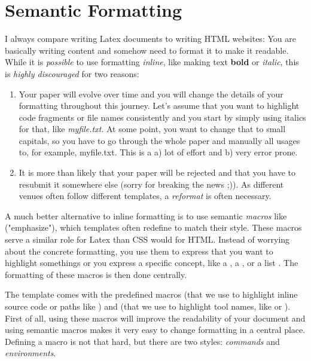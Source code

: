 \section{Semantic Formatting}

I always compare writing Latex documents to writing HTML websites: You are basically writing content and somehow need to format it to make it readable.
While it is \emph{possible} to use formatting \emph{inline}, like making text {\bf bold} or {\it italic}, this is \emph{highly discouraged} for two reasons:

\begin{enumerate}
%
\item Your paper will evolve over time and you will change the details of your formatting throughout this journey.
Let's assume that you want to highlight code fragments or file names consistently and you start by simply using italics for that, like {\it myfile.txt}.
At some point, you want to change that to small capitals, so you have to go through the whole paper and manually all usages to, for example, {\sc myfile.txt}.
This is a a) lot of effort and b) very error prone.
%
\item It is more than likely that your paper will be rejected and that you have to resubmit it somewhere else (sorry for breaking the news ;)).
As different venues often follow different templates, a \emph{reformat} is often necessary.
%
\end{enumerate}

A much better alternative to inline formatting is to use semantic \emph{macros} like  ("emphasize"), which templates often redefine to match their style.
These macros serve a similar role for Latex than CSS would for HTML.
Instead of worrying about the concrete formatting, you use them to express that you want to highlight somethings or you express a specific concept, like a , a , or a list .
The formatting of these macros is then done centrally.

The template comes with the predefined macros  (that we use to highlight inline source code or paths like ) and  (that we use to highlight tool names, like  or ).
First of all, using these macros will improve the readability of your document and using semantic macros makes it very easy to change formatting in a central place.
Defining a macro is not that hard, but there are two styles: \emph{commands} and \emph{environments}.

